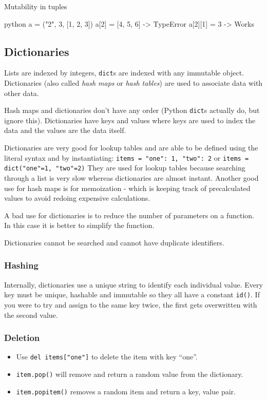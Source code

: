 \begin{highlight}{Mutability in tuples}
    \begin{code}{python}
		a = ("2", 3, [1, 2, 3])
		a[2] = [4, 5, 6] -> TypeError
		a[2][1] = 3 -> Works
    \end{code}
\end{highlight}

\subsection{Dictionaries}\label{sub:dictionaries}

Lists are indexed by integers, \texttt{dict}s are indexed with any immutable object.
Dictionaries (also called \emph{hash maps} or \emph{hash tables}) are used to associate data with other data.

Hash maps and dictionaries don't have any order (Python \texttt{dict}s actually do, but ignore this).
Dictionaries have keys and values where keys are used to index the data and the values are the data itself.

Dictionaries are very good for lookup tables and are able to be defined using the literal syntax and by instantiating: \texttt{items = {"one": 1, "two": 2}} or \texttt{items = dict("one"=1, "two"=2)}
They are used for lookup tables because searching through a list is very slow whereas dictionaries are almost instant.
Another good use for hash maps is for memoization - which is keeping track of precalculated values to avoid redoing expensive calculations.

A bad use for dictionaries is to reduce the number of parameters on a function.
In this case it is better to simplify the function.

\begin{note}
	Dictionaries cannot be searched and cannot have duplicate identifiers.
\end{note}

\subsubsection{Hashing}\label{ssub:hashing}

Internally, dictionaries use a unique string to identify each individual value.
Every key must be unique, hashable and immutable so they all have a constant \texttt{id()}.
If you were to try and assign to the same key twice, the first gets overwritten with the second value.

\subsubsection{Deletion}\label{ssub:deletion}

\begin{itemize}
	\item Use \texttt{del items["one"]} to delete the item with key ``one''.
	\item \texttt{item.pop()} will remove and return a random value from the dictionary.
	\item \texttt{item.popitem()} removes a random item and return a key, value pair.
\end{itemize}
